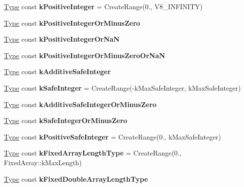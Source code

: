 \begin{DoxyCompactItemize}
\mbox{\hyperlink{classv8_1_1internal_1_1compiler_1_1Type}{Type}} const {\bfseries k\+Positive\+Integer} = Create\+Range(0., V8\+\_\+\+I\+N\+F\+I\+N\+I\+TY)
\item 
\mbox{\hyperlink{classv8_1_1internal_1_1compiler_1_1Type}{Type}} const {\bfseries k\+Positive\+Integer\+Or\+Minus\+Zero}
\item 
\mbox{\hyperlink{classv8_1_1internal_1_1compiler_1_1Type}{Type}} const {\bfseries k\+Positive\+Integer\+Or\+NaN}
\item 
\mbox{\hyperlink{classv8_1_1internal_1_1compiler_1_1Type}{Type}} const {\bfseries k\+Positive\+Integer\+Or\+Minus\+Zero\+Or\+NaN}
\item 
\mbox{\hyperlink{classv8_1_1internal_1_1compiler_1_1Type}{Type}} const {\bfseries k\+Additive\+Safe\+Integer}
\item 
\mbox{\label{classv8_1_1internal_1_1compiler_1_1TypeCache_a8bbba0f24d1075e4eebb495d9d1af3dc}} 
\mbox{\hyperlink{classv8_1_1internal_1_1compiler_1_1Type}{Type}} const {\bfseries k\+Safe\+Integer} = Create\+Range(-\/k\+Max\+Safe\+Integer, k\+Max\+Safe\+Integer)
\item 
\mbox{\hyperlink{classv8_1_1internal_1_1compiler_1_1Type}{Type}} const {\bfseries k\+Additive\+Safe\+Integer\+Or\+Minus\+Zero}
\item 
\mbox{\hyperlink{classv8_1_1internal_1_1compiler_1_1Type}{Type}} const {\bfseries k\+Safe\+Integer\+Or\+Minus\+Zero}
\item 
\mbox{\label{classv8_1_1internal_1_1compiler_1_1TypeCache_ad13043d31f0e09aabb2d208daea623a5}} 
\mbox{\hyperlink{classv8_1_1internal_1_1compiler_1_1Type}{Type}} const {\bfseries k\+Positive\+Safe\+Integer} = Create\+Range(0., k\+Max\+Safe\+Integer)
\item 
\mbox{\label{classv8_1_1internal_1_1compiler_1_1TypeCache_ac1ebd7d84a1efdcbf7b33e634e55f623}} 
\mbox{\hyperlink{classv8_1_1internal_1_1compiler_1_1Type}{Type}} const {\bfseries k\+Fixed\+Array\+Length\+Type} = Create\+Range(0., Fixed\+Array\+::k\+Max\+Length)
\item 
\mbox{\hyperlink{classv8_1_1internal_1_1compiler_1_1Type}{Type}} const {\bfseries k\+Fixed\+Double\+Array\+Length\+Type}
\item 
\mbox{\label{classv8_1_1internal_1_1compiler_1_1TypeCache_a332f238668283044fe7b3703b42086d9}} 

\end{DoxyCompactItemize}
